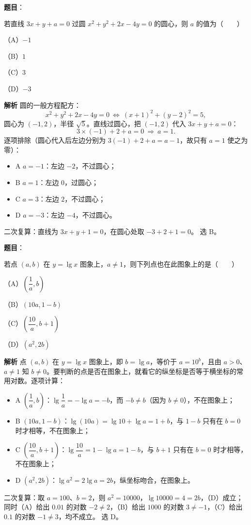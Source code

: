 \begin{answer}

\textbf{题目}：

若直线 $3x+y+a=0$ 过圆 $x^2+y^2+2x-4y=0$ 的圆心，则 $a$ 的值为\mbox{（　　）}

（A）$-1$

（B）$1$

（C）$3$

（D）$-3$

\textbf{解析}
圆的一般方程配方：
\nopagebreak[4]
\[
x^2+y^2+2x-4y=0\ \Longleftrightarrow\ (x+1)^2+(y-2)^2=5,
\]
圆心为 $(-1,2)$，半径 $\sqrt5$。直线过圆心，把 $(-1,2)$ 代入 $3x+y+a=0$：
\nopagebreak[4]
\[
3\times(-1)+2+a=0\ \Longrightarrow\ a=1.
\]
逐项排除（圆心代入后左边分别为 $3(-1)+2+a=a-1$，故只有 $a=1$ 使之为零）：
\begin{itemize}
\item A $a=-1$：左边 $-2$，不过圆心；
\item B $a=1$：左边 $0$，过圆心；
\item C $a=3$：左边 $2$，不过圆心；
\item D $a=-3$：左边 $-4$，不过圆心。
\end{itemize}
二次复算：直线为 $3x+y+1=0$，在圆心处取 $-3+2+1=0$。
选 B。


\end{answer}
\begin{answer}

\textbf{题目}：

若点 $(a,b)$ 在 $y=\lg x$ 图象上，$a\neq1$，则下列点也在此图象上的是\mbox{（　　）}

（A）$\left(\dfrac1a,b\right)$

（B）$(10a,1-b)$

（C）$\left(\dfrac{10}{a},b+1\right)$

（D）$(a^2,2b)$

\textbf{解析}
点 $(a,b)$ 在 $y=\lg x$ 图象上，即 $b=\lg a$，等价于 $a=10^b$，且由 $a>0$、$a\neq1$ 知 $b\neq0$。要判断的点是否在图象上，就看它的纵坐标是否等于横坐标的常用对数。逐项计算：
\begin{itemize}
\item A $\left(\dfrac1a,b\right)$：$\lg\dfrac1a=-\lg a=-b$，而 $-b\neq b$（因为 $b\neq0$），不在图象上；
\item B $(10a,1-b)$：$\lg(10a)=\lg10+\lg a=1+b$，与 $1-b$ 只有在 $b=0$ 时才相等，不在图象上；
\item C $\left(\dfrac{10}{a},b+1\right)$：$\lg\dfrac{10}{a}=1-\lg a=1-b$，与 $b+1$ 只有在 $b=0$ 时才相等，不在图象上；
\item D $(a^2,2b)$：$\lg a^2=2\lg a=2b$，纵坐标吻合，在图象上。
\end{itemize}
二次复算：取 $a=100$、$b=2$，则 $a^2=10000$，$\lg10000=4=2b$，（D）成立；同时（A）给出 $0.01$ 的对数 $-2\neq2$，（B）给出 $1000$ 的对数 $3\neq-1$，（C）给出 $0.1$ 的对数 $-1\neq3$，均不成立。
选 D。


\end{answer}
